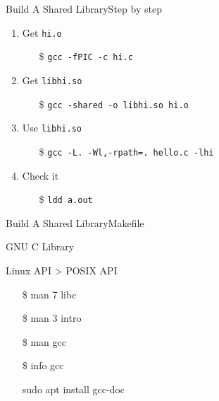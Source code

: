 \begin{frame}{Build A Shared Library}{Step by step}
  \begin{enumerate}
  \item Get \alert{\texttt{hi.o}}
    \begin{itemize}
    \item[\$] \texttt{gcc -fPIC -c hi.c}
    \end{itemize}
  \item Get \alert{\texttt{libhi.so}}
    \begin{itemize}
    \item[\$] \texttt{gcc -shared -o libhi.so hi.o}
    \end{itemize}
  \item Use \alert{\texttt{libhi.so}}
    \begin{itemize}
    \item[\$] \texttt{gcc -L. -Wl,-rpath=. hello.c -lhi}
    \end{itemize}
  \item Check it
    \begin{itemize}
    \item[\$] \texttt{ldd a.out}
    \end{itemize}
  \end{enumerate}
\end{frame}

\begin{frame}{Build A Shared Library}{Makefile}
  \centering
\end{frame}

\begin{frame}{GNU C Library}
  \begin{minipage}{.55\linewidth}
    Linux API > POSIX API
    \ttfamily
    \begin{itemize}
    \item[\$] man 7 libc
    \item[\$] man 3 intro
    \item[\$] man gcc
    \item[\$] info gcc
    \item[\debian] sudo apt install gcc-doc
    \end{itemize}
  \end{minipage}
  \begin{minipage}{.4\linewidth}
    \begin{center}
    \end{center}
  \end{minipage}
\end{frame}

